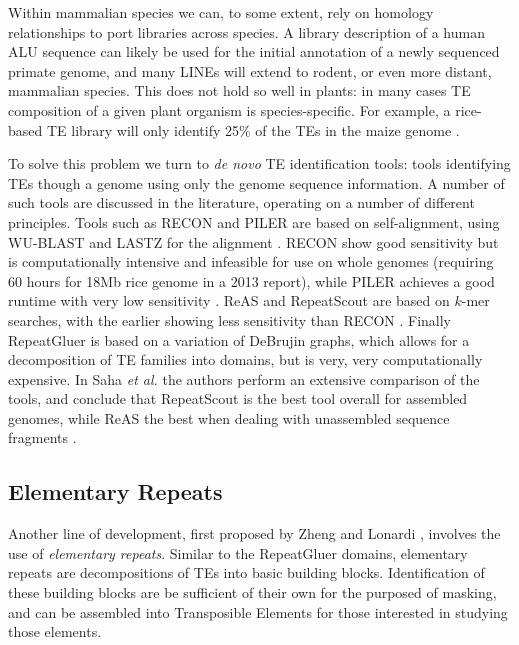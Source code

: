 \documentclass{bmcart}
\begin{document}
Within mammalian species we can, to some extent, rely on homology
relationships to port libraries across species.  A library description
of a human ALU sequence can likely be used for the initial annotation
of a newly sequenced primate genome, and many LINEs will extend to
rodent, or even more distant, mammalian species.  This does not hold
so well in plants: in many cases TE composition of a given plant organism
is species-specific.  For example, a rice-based TE library will only identify 25\%
of the TEs in the maize genome \cite{Jiang:2013jt}.

To solve this problem we turn to {\it de novo} TE identification
tools: tools identifying TEs though a genome using only the genome
sequence information.  A number of such tools are discussed in the
literature, operating on a number of different principles.  Tools such
as RECON \cite{Bao:2002} and PILER \cite{Edgar:2005p2365} are based on
self-alignment, using WU-BLAST and LASTZ for the alignment
\cite{Lopez:2003td,Harris:2007uf}.  RECON show good sensitivity but is
computationally intensive and infeasible for use on whole genomes
(requiring 60 hours for 18Mb rice genome in a 2013 report), while
PILER achieves a good runtime with very low sensitivity
\cite{Jiang:2013jt}.  ReAS \cite{Li:2005p3138} and RepeatScout
\cite{Price:2005p1247} are based on $k$-mer searches, with the
earlier showing less sensitivity than RECON \cite{Jiang:2013jt}.
Finally RepeatGluer \cite{Pevzner:2004p3157,Zhi:2006p3199} is
based on a variation of DeBrujin graphs, which allows for a
decomposition of TE families into domains, but is very, very
computationally expensive.  In Saha {\it et al.} the authors perform
an extensive comparison of the tools, and conclude that RepeatScout is
the best tool overall for assembled genomes, while ReAS the best when
dealing with unassembled sequence fragments \cite{Saha:2008dm}.

\subsection*{Elementary Repeats}
Another line of development, first proposed by Zheng and Lonardi
\cite{Zheng:2005bl}, involves the use of {\it elementary repeats}.
Similar to the RepeatGluer domains, elementary repeats are
decompositions of TEs into basic building blocks.  Identification of
these building blocks are be sufficient of their own for the purposed
of masking, and can be assembled into Transposible Elements for those
interested in studying those elements.
\end{document}
